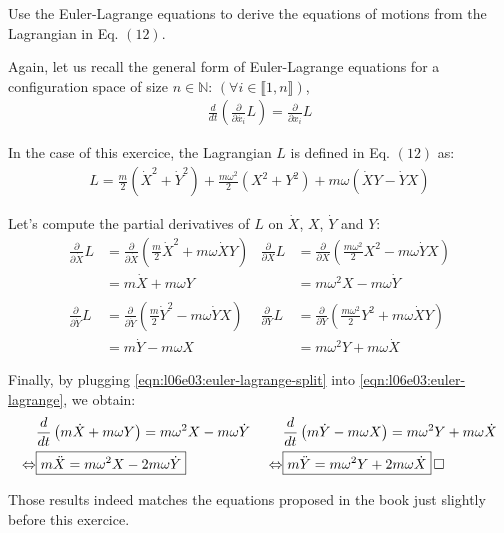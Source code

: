 \documentclass[solutions.tex]{subfiles}
\begin{document}
\maketitle
\begin{exercise}
Use the Euler-Lagrange equations to derive the equations of motions
from the Lagrangian in Eq. $(12)$.
\end{exercise}
Again, let us recall the general form of Euler-Lagrange equations
for a configuration space of size $n\in\mathbb{N}$: $(\forall i \in\llbracket 1, n\rrbracket)$,
\begin{align}
	\frac{d}{dt}\left(\frac{\partial}{\partial\dot{x_i}}L\right)
		= \frac{\partial}{\partial x_i}L
	\label{eqn:l06e03:euler-lagrange}
\end{align}

In the case of this exercice, the Lagrangian $L$ is defined in Eq. $(12)$ as:
\begin{align}
	L = \frac{m}{2}(\dot{X}^2+\dot{Y}^2)
	  + \frac{m\omega^2}{2}(X^2+Y^2)
	  + m\omega(\dot{X}Y-\dot{Y}X) \nonumber
\end{align}

Let's compute the partial derivatives of $L$ on $\dot{X}$, $X$, $\dot{Y}$ and $Y$:
\begin{align}
	\frac{\partial}{\partial\dot{X}}L &=
		\frac{\partial}{\partial\dot{X}}
			\left(\frac{m}{2}\dot{X}^2 + m\omega\dot{X}Y\right)
	& \frac{\partial}{\partial X}L &=
		\frac{\partial}{\partial X}
			\left(\frac{m\omega^2}{2}X^2 - m\omega\dot{Y}X\right)
		\nonumber \\
	~ &= m\dot{X} + m\omega Y & ~ &= m\omega^2 X - m\omega\dot{Y} \nonumber\\
	~ & ~ & ~ & \nonumber \\
	\frac{\partial}{\partial\dot{Y}}L &=
		\frac{\partial}{\partial\dot{Y}}
			\left(\frac{m}{2}\dot{Y}^2 - m\omega\dot{Y}X\right)
	& \frac{\partial}{\partial Y}L &=
		\frac{\partial}{\partial Y}
			\left(\frac{m\omega^2}{2}Y^2 + m\omega\dot{X}Y\right)
		\nonumber \\
	~ &= m\dot{Y} - m\omega X & ~ &= m\omega^2 Y + m\omega\dot{X}
	\label{eqn:l06e03:euler-lagrange-split}
\end{align}

Finally, by plugging \eqref{eqn:l06e03:euler-lagrange-split} into
\eqref{eqn:l06e03:euler-lagrange}, we obtain:
\begin{align*}
	~ & \frac{d}{dt}\left(m\dot{X} + m\omega Y\right) = m\omega^2 X - m\omega\dot{Y}
	& ~ & \frac{d}{dt}\left(m\dot{Y} - m\omega X\right) = m\omega^2 Y + m\omega\dot{X}\\
	\Leftrightarrow & \boxed{m\ddot{X} = m\omega^2X-2m\omega\dot{Y}}
	& ~ \Leftrightarrow & \boxed{m\ddot{Y} = m\omega^2Y+2m\omega\dot{X}} \qed
\end{align*}
\begin{remark} Those results indeed matches the equations proposed
in the book just slightly before this exercice.
\end{remark}
\end{document}
